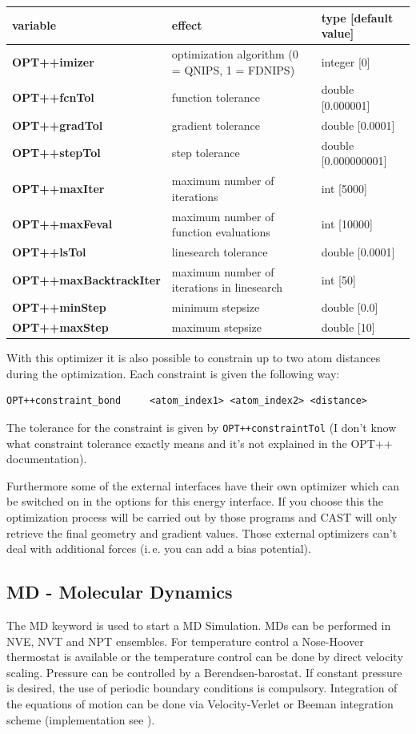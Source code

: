 \documentclass[10pt,a4paper]{article} %
\begin{document}
	\begin{longtable}{|p{4.5cm}|p{4cm}|p{3cm}|}
		variable & effect & type [default value] \\
		\hline
		\textbf{OPT++imizer} & optimization algorithm (0 = QNIPS, 1 = FDNIPS) & integer [0] \\
		\textbf{OPT++fcnTol} & function tolerance & double [0.000001] \\
		\textbf{OPT++gradTol} & gradient tolerance & double [0.0001] \\
		\textbf{OPT++stepTol} & step tolerance & double [0.000000001] \\
		\textbf{OPT++maxIter} & maximum number of iterations & int [5000] \\
		\textbf{OPT++maxFeval} & maximum number of function evaluations & int [10000] \\
		\textbf{OPT++lsTol} & linesearch tolerance & double [0.0001] \\
		\textbf{OPT++maxBacktrackIter} & maximum number of iterations in linesearch & int [50] \\
		\textbf{OPT++minStep} & minimum stepsize & double [0.0] \\
		\textbf{OPT++maxStep} & maximum stepsize & double [10]
	\end{longtable}

With this optimizer it is also possible to constrain up to two atom distances during the optimization. Each constraint is given the following way:
\begin{lstlisting}
OPT++constraint_bond     <atom_index1> <atom_index2> <distance>
\end{lstlisting}
The tolerance for the constraint is given by \texttt{OPT++constraintTol} (I don't know what constraint tolerance exactly means and it's not explained in the OPT++ documentation).
	
	Furthermore some of the external interfaces have their own optimizer which can be switched on in the options for this energy interface. If you choose this the optimization process will be carried out by those programs and \ac{CAST} will only retrieve the final geometry and gradient values. Those external optimizers can't deal with additional forces (i.\,e. you can add a bias potential).

	\subsection{MD - Molecular Dynamics}
	The MD keyword is used to start a \acf{MD} Simulation\supercite{md_art}. \acp{MD} can be performed in NVE, NVT and NPT ensembles. For temperature control a Nose-Hoover thermostat\supercite{nose,hoover} is available or the temperature control can be done by direct velocity scaling. Pressure can be controlled by a Berendsen-barostat\supercite{berendsen}. If constant pressure is desired, the use of periodic boundary conditions is compulsory. Integration of the equations of motion can be done via Velocity-Verlet or Beeman\supercite{beeman} integration scheme (implementation see \cite{becker_development_2015}). 
\end{document}
